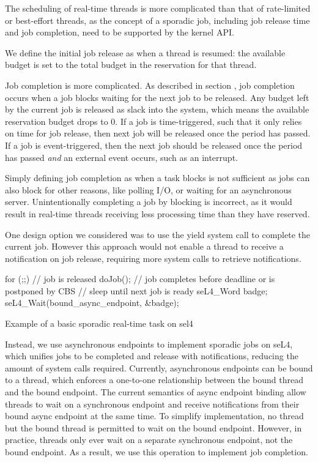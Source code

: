 The scheduling of real-time threads is more complicated than that of rate-limited or best-effort threads, as the concept of a sporadic job, including job release time and job completion, need to be supported by the kernel API.

We define the initial job release as when a thread is resumed: the available budget is set to the total budget in the reservation for that thread.

Job completion is more complicated.
As described in section , job completion occurs when a job blocks waiting for the next job to be released.
Any budget left by the current job is released as slack into the system, which means the available reservation budget drops to 0.
If a job is time-triggered, such that it only relies on time for job release, then next job will be released once the period has passed.
If a job is event-triggered, then the next job should be released once the period has passed \textit{and} an external event occurs, such as an interrupt.

Simply defining job completion as when a task blocks is not sufficient as jobs can also block for other reasons, like polling I/O, or waiting for an asynchronous server.
Unintentionally completing a job by blocking is incorrect, as it would result in real-time threads receiving less processing time than they have reserved.

One design option we considered was to use the yield system call to complete the current job.
However this approach would not enable a thread to receive a notification on job release, requiring more system calls to retrieve notifications.

\begin{listing}
\begin{ccode}
    for (;;) {
        // job is released
        doJob();
        // job completes before deadline or is postponed by CBS
        // sleep until next job is ready
        seL4_Word badge;
        seL4_Wait(bound_async_endpoint, &badge);
    }
\end{ccode}
\caption{Example of a basic sporadic real-time task on sel4}
\label{list:sporadic-sel4}
\end{listing}

Instead, we use asynchronous endpoints to implement sporadic jobs on seL4, which unifies jobs to be completed and release with notifications, reducing the amount of system calls required.
Currently, asynchronous endpoints can be bound to a thread, which enforces a one-to-one relationship between the bound thread and the bound endpoint.
The current semantics of async endpoint binding allow threads to wait on a synchronous endpoint and receive notifications from their bound async endpoint at the same time.
To simplify implementation, no thread but the bound thread is permitted to wait on the bound endpoint.
However, in practice, threads only ever wait on a separate synchronous endpoint, not the bound endpoint.
As a result, we use this operation to implement job completion.

